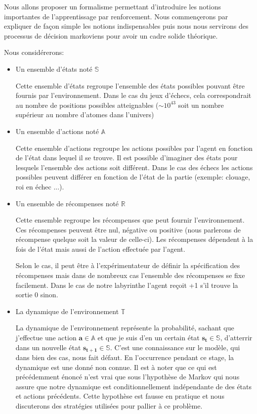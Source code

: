 Nous allons proposer un formalisme  permettant d'introduire les notions importantes de l'apprentissage par renforcement. Nous commençerons par expliquer de façon simple les notions indispensables puis nous nous servirons des processus de décision markoviens pour avoir un cadre solide théorique.

Nous considérerons: 

\begin{itemize}
    \item Un ensemble d'états noté $\bm{\mathbb{S}}$
    
        Cette ensemble d'états regroupe l'ensemble des états possibles pouvant être fournis par l'environnement. Dans le cas du jeux d'échecs, cela correspondrait au nombre de positions possibles atteignables ($\sim 10^{43}$ soit un nombre supérieur au nombre d'atomes dans l'univers)
    
    \item Un ensemble d'actions noté $\bm{\mathbb{A}}$
    
        Cette ensemble d'actions regroupe les actions possibles par l'agent en fonction de l'état dans lequel il se trouve. Il est possible d'imaginer des états pour lesquels l'ensemble des actions soit différent. Dans le cas des échecs les actions possibles peuvent différer en fonction de l'état de la partie (exemple: clouage, roi en échec ...).

    \item Un ensemble de récompenses noté $\bm{\mathbb{R}}$
    
        Cette ensemble regroupe les récompenses que peut fournir l'environnement. Ces récompenses peuvent être nul, négative ou positive (nous parlerons de récompense quelque soit la valeur de celle-ci). Les récompenses dépendent à la fois de l'état mais aussi de l'action effectuée par l'agent.
    
        Selon le cas, il peut être à l'expérimentateur de définir la spécification des récompenses mais dans de nombreux cas l'ensemble des récompenses se fixe facilement. Dans le cas de notre labyrinthe l'agent reçoit +1 s'il trouve la sortie 0 sinon.
    \item La dynamique de l'environnement $\bm{\mathbb{T}}$
    
        La dynamique de l'environnement représente la probabilité, sachant que j'effectue une action $\bm{a \in \mathbb{A}}$ et que je suis d'en un certain état $\bm{s_t \in \mathbb{S}}$, d'atterrir dans un nouvelle état  $\bm{s_{t+1} \in \mathbb{S}}$. C'est une connaissance sur le modèle, qui dans bien des cas, nous fait défaut. En l'occurrence  pendant ce stage, la dynamique est une donné non connue. Il est à noter que ce qui est précédemment énoncé n'est vrai que sous l'hypothèse de Markov qui nous assure que notre dynamique est conditionnellement indépendante de  des états et actions précédents. Cette hypothèse est fausse en pratique et nous discuterons des stratégies utilisées pour pallier à ce problème. 
    

\end{itemize}
